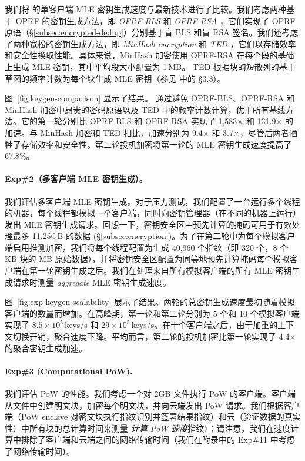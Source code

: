 我们将 \sysname 的单客户端 MLE 密钥生成速度与最新技术进行了比较。我们考虑两种基于 OPRF 的密钥生成方法，即 \textit{ OPRF-BLS} \cite{armknecht15} 和 \textit{ OPRF-RSA} \cite{bellare13b}，它们实现了 OPRF 原语（\S\ref{subsec:encrypted-dedup}）分别基于盲 BLS 和盲 RSA 签名。我们还考虑了两种宽松的密钥生成方法，即 \textit{ MinHash encryption} \cite{qin17} 和 \textit{ TED} \cite{li20b}，它们以存储效率和安全性换取性能。具体来说，MinHash 加密使用 OPRF-RSA 在每个段的基础上生成 MLE 密钥，其中平均段大小配置为 1\,MB。 TED 根据块的短散列的基于草图的频率计数为每个块生成 MLE 密钥（参见 \cite{li20b} 中的 \S3.3）。

图~\ref{fig:keygen-comparison} 显示了结果。 \sysname 通过避免 OPRF-BLS、OPRF-RSA 和 MinHash 加密中昂贵的密码原语以及 TED 中的频率计数计算，优于所有基线方法。它的第一轮分别比 OPRF-BLS 和 OPRF-RSA 实现了 1,583$\times$ 和 131.9$\times$ 的加速。与 MinHash 加密和 TED 相比，加速分别为 9.4$\times$ 和 3.7$\times$，尽管后两者牺牲了存储效率和安全性。第二轮投机加密将第一轮的 MLE 密钥生成速度提高了 67.8\%。



\paragraph{Exp\#2（多客户端 MLE 密钥生成）。} 我们评估多客户端 MLE 密钥生成。对于压力测试，我们配置了一台运行多个线程的机器，每个线程都模拟一个客户端，同时向密钥管理器（在不同的机器上运行）发出 MLE 密钥生成请求。回想一下，密钥安全区中预先计算的掩码可用于有效处理最多 11.25GB 的数据 (\S\ref{subsec:encryption})。为了在第二轮中为每个模拟客户端启用推测加密，我们将每个线程配置为生成 40,960 个指纹（即 320 个，8 个 KB 块的 MB 原始数据），并将密钥安全区配置为同等地预先计算掩码每个模拟客户端在第一轮密钥生成之后。我们在处理来自所有模拟客户端的所有 MLE 密钥生成请求时测量 \textit{ aggregate} MLE 密钥生成速度。

图~\ref{fig:exp-keygen-scalability} 展示了结果。两轮的总密钥生成速度最初随着模拟客户端的数量而增加。在高峰期，第一轮和第二轮分别为 5 个和 10 个模拟客户端实现了 $8.5\times 10^5$\,keys/s 和 $29\times 10^5$\,keys/s。在十个客户端之后，由于加重的上下文切换开销，聚合速度下降。平均而言，第二轮的投机加密比第一轮实现了 4.4$\times$ 的聚合密钥生成加速。


\paragraph{Exp\#3 (Computational PoW).} 我们评估 PoW 的性能。我们考虑一个对 2GB 文件执行 PoW 的客户端。客户端从文件中创建明文块，加密每个明文块，并向云端发出 PoW 请求。我们根据客户端（PoW enclave 对密文块执行指纹识别并签署结果指纹）和云（验证数据的真实性）中所有块的总计算时间来测量 \textit{ 计算 PoW 速度}指纹）；请注意，我们在速度计算中排除了客户端和云端之间的网络传输时间（我们在附录中的 Exp\#11 中考虑了网络传输时间）。

